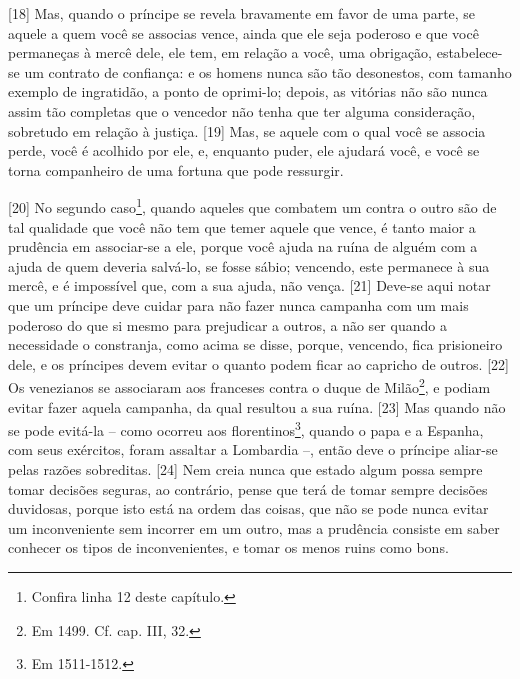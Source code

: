 {[}18{]} Mas, quando o príncipe se revela bravamente em favor de uma
parte, se aquele a quem você se associas vence, ainda que ele seja
poderoso e que você permaneças à mercê dele, ele tem, em relação a você,
uma obrigação, estabelece-se um contrato de confiança: e os homens nunca
são tão desonestos, com tamanho exemplo de ingratidão, a ponto de
oprimi-lo; depois, as vitórias não são nunca assim tão completas que o
vencedor não tenha que ter alguma consideração, sobretudo em relação à
justiça. {[}19{]} Mas, se aquele com o qual você se associa perde, você
é acolhido por ele, e, enquanto puder, ele ajudará você, e você se torna
companheiro de uma fortuna que pode ressurgir.

{[}20{]} No segundo caso\footnote{Confira linha 12 deste capítulo.},
quando aqueles que combatem um contra o outro são de tal qualidade que
você não tem que temer aquele que vence, é tanto maior a prudência em
associar-se a ele, porque você ajuda na ruína de alguém com a ajuda de
quem deveria salvá-lo, se fosse sábio; vencendo, este permanece à sua
mercê, e é impossível que, com a sua ajuda, não vença. {[}21{]} Deve-se
aqui notar que um príncipe deve cuidar para não fazer nunca campanha com
um mais poderoso do que si mesmo para prejudicar a outros, a não ser
quando a necessidade o constranja, como acima se disse, porque,
vencendo, fica prisioneiro dele, e os príncipes devem evitar o quanto
podem ficar ao capricho de outros. {[}22{]} Os venezianos se associaram
aos franceses contra o duque de Milão\footnote{Em 1499. Cf. cap. III,
  32.}, e podiam evitar fazer aquela campanha, da qual resultou a sua
ruína. {[}23{]} Mas quando não se pode evitá-la -- como ocorreu aos
florentinos\footnote{Em 1511-1512.}, quando o papa e a Espanha, com seus
exércitos, foram assaltar a Lombardia --, então deve o príncipe aliar-se
pelas razões sobreditas. {[}24{]} Nem creia nunca que estado algum possa
sempre tomar decisões seguras, ao contrário, pense que terá de tomar
sempre decisões duvidosas, porque isto está na ordem das coisas, que não
se pode nunca evitar um inconveniente sem incorrer em um outro, mas a
prudência consiste em saber conhecer os tipos de inconvenientes, e tomar
os menos ruins como bons.

